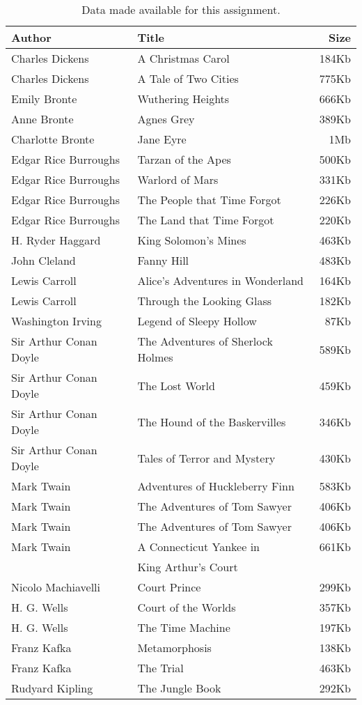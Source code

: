 \documentclass{IEEEtran}
\begin{document}
\begin{table}
\caption{Data made available for this assignment.\label{tab:books}}
\vspace{-18pt}
\begin{center}
\begin{tabular}{llr}
\hline
Author & Title & Size\hspace{0.9em} \\
\hline
Charles Dickens & A Christmas Carol & 184Kb \\
Charles Dickens & A Tale of Two Cities & 775Kb \\
Emily Bronte & Wuthering Heights & 666Kb \\
Anne Bronte & Agnes Grey & 389Kb \\
Charlotte Bronte & Jane Eyre & 1Mb \\
Edgar Rice Burroughs & Tarzan of the Apes & 500Kb \\
Edgar Rice Burroughs & Warlord of Mars & 331Kb \\
Edgar Rice Burroughs & The People that Time Forgot & 226Kb \\
Edgar Rice Burroughs & The Land that Time Forgot & 220Kb \\
H. Ryder Haggard & King Solomon's Mines & 463Kb \\
John Cleland & Fanny Hill & 483Kb \\
Lewis Carroll & Alice's Adventures in Wonderland & 164Kb \\
Lewis Carroll & Through the Looking Glass & 182Kb \\
Washington Irving & Legend of Sleepy Hollow & 87Kb \\
Sir Arthur Conan Doyle & The Adventures of Sherlock Holmes & 589Kb \\
Sir Arthur Conan Doyle & The Lost World & 459Kb \\
Sir Arthur Conan Doyle & The Hound of the Baskervilles & 346Kb \\
Sir Arthur Conan Doyle & Tales of Terror and Mystery & 430Kb \\
Mark Twain & Adventures of Huckleberry Finn & 583Kb \\
Mark Twain & The Adventures of Tom Sawyer & 406Kb \\
Mark Twain & The Adventures of Tom Sawyer & 406Kb \\
Mark Twain & A Connecticut Yankee in & 661Kb \\
           & King Arthur's Court & \\
Nicolo Machiavelli & Court Prince & 299Kb \\
H. G. Wells & Court of the Worlds & 357Kb \\
H. G. Wells & The Time Machine & 197Kb \\
Franz Kafka & Metamorphosis & 138Kb \\
Franz Kafka & The Trial & 463Kb \\
Rudyard Kipling & The Jungle Book & 292Kb \\
\hline
\end{tabular}
\end{center}
\end{table}
\end{document}
